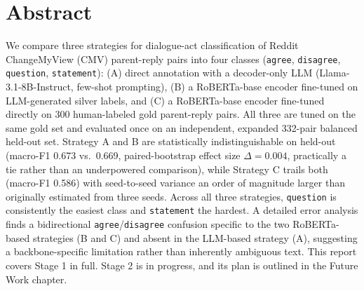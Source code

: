 

\chapter*{Abstract}

We compare three strategies for dialogue-act classification of Reddit
ChangeMyView (CMV) parent-reply pairs into four classes (\texttt{agree},
\texttt{disagree}, \texttt{question}, \texttt{statement}): (A) direct
annotation with a decoder-only LLM (Llama-3.1-8B-Instruct, few-shot
prompting), (B) a RoBERTa-base encoder fine-tuned on LLM-generated silver
labels, and (C) a RoBERTa-base encoder fine-tuned directly on 300
human-labeled gold parent-reply pairs. All three are tuned on the same
gold set and evaluated once on an independent, expanded 332-pair balanced
held-out set.
Strategy A and B are statistically indistinguishable on held-out
(macro-F1 0.673 vs.\ 0.669, paired-bootstrap effect size $\Delta=0.004$,
practically a tie rather than an underpowered comparison), while Strategy C
trails both (macro-F1 0.586) with seed-to-seed variance an order of
magnitude larger than originally estimated from three seeds. Across all
three strategies, \texttt{question} is consistently the easiest class and
\texttt{statement} the hardest. A detailed error analysis finds a
bidirectional \texttt{agree}/\texttt{disagree} confusion specific to the two
RoBERTa-based strategies (B and C) and absent in the LLM-based strategy (A),
suggesting a backbone-specific limitation rather than inherently ambiguous
text. This report covers Stage 1 in full. Stage 2 is in progress, and its
plan is outlined in the Future Work chapter.


